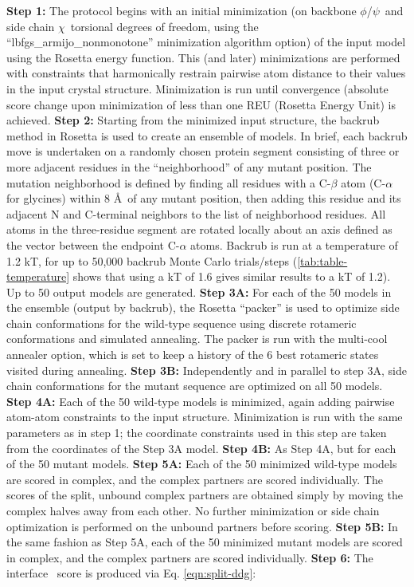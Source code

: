 \textbf{Step 1:} The protocol begins with an initial minimization (on backbone $\phi$/$\psi$\ and side chain $\chi$\ torsional degrees of freedom, using the ``lbfgs\_armijo\_nonmonotone'' minimization algorithm option) of the input model using the Rosetta energy function. This (and later) minimizations are performed with constraints that harmonically restrain pairwise atom distance to their values in the input crystal structure. Minimization is run until convergence (absolute score change upon minimization of less than one REU (Rosetta Energy Unit) is achieved.
\textbf{Step 2:} Starting from the minimized input structure, the backrub method in Rosetta\cite{smith_backrub-like_2008} is used to create an ensemble of models. In brief, each backrub move is undertaken on a randomly chosen protein segment consisting of three or more adjacent residues in the ``neighborhood'' of any mutant position.
The mutation neighborhood is defined by finding all residues with a C-$\beta$ atom (C-$\alpha$ for glycines) within 8 \AA\ of any mutant position, then adding this residue and its adjacent N and C-terminal neighbors to the list of neighborhood residues.
All atoms in the three-residue segment are rotated locally about an axis defined as the vector between the endpoint C-$\alpha$ atoms. Backrub is run at a temperature of 1.2 kT, for up to 50,000 backrub Monte Carlo trials/steps (\cref{tab:table-temperature} shows that using a kT of 1.6 gives similar results to a kT of 1.2). Up to 50 output models are generated.
\textbf{Step 3A:} For each of the 50 models in the ensemble (output by backrub), the Rosetta ``packer'' is used to optimize side chain conformations for the wild-type sequence using discrete rotameric conformations \cite{shapovalov_smoothed_2011} and simulated annealing. The packer is run with the multi-cool annealer option\cite{leaver-fay_generic_2011}, which is set to keep a history of the 6 best rotameric states visited during annealing.
\textbf{Step 3B:} Independently and in parallel to step 3A, side chain conformations for the mutant sequence are optimized on all 50 models.
\textbf{Step 4A:} Each of the 50 wild-type models is minimized, again adding pairwise atom-atom constraints to the input structure. Minimization is run with the same parameters as in step 1; the coordinate constraints used in this step are taken from the coordinates of the Step 3A model.
\textbf{Step 4B:} As Step 4A, but for each of the 50 mutant models.
\textbf{Step 5A:} Each of the 50 minimized wild-type models are scored in complex, and the complex partners are scored individually. The scores of the split, unbound complex partners are obtained simply by moving the complex halves away from each other. No further minimization or side chain optimization is performed on the unbound partners before scoring.
\textbf{Step 5B:} In the same fashion as Step 5A, each of the 50 minimized mutant models are scored in complex, and the complex partners are scored individually.
\textbf{Step 6:} The interface \ddg\ score is produced via Eq. \ref{eqn:split-ddg}:

